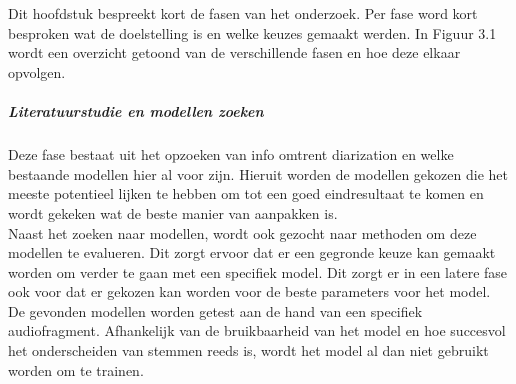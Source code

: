 
\chapter{}%
\label{ch:methodologie}


Dit hoofdstuk bespreekt kort de fasen van het onderzoek. Per fase word kort besproken wat de doelstelling is en welke keuzes gemaakt werden. In Figuur 3.1 wordt een overzicht getoond van de verschillende fasen en hoe deze elkaar opvolgen.

\paragraph{Literatuurstudie en modellen zoeken}
Deze fase bestaat uit het opzoeken van info omtrent diarization en welke bestaande modellen hier al voor zijn. Hieruit worden de modellen gekozen die het meeste potentieel lijken te hebben om tot een goed eindresultaat te komen en wordt gekeken wat de beste manier van aanpakken is.\\
Naast het zoeken naar modellen, wordt ook gezocht naar methoden om deze modellen te evalueren. Dit zorgt ervoor dat er een gegronde keuze kan gemaakt worden om verder te gaan met een specifiek model. Dit zorgt er in een latere fase ook voor dat er gekozen kan worden voor de beste parameters voor het model.\\
De gevonden modellen worden getest aan de hand van een specifiek audiofragment. Afhankelijk van de bruikbaarheid van het model en hoe succesvol het onderscheiden van stemmen reeds is, wordt het model al dan niet gebruikt worden om te trainen.

